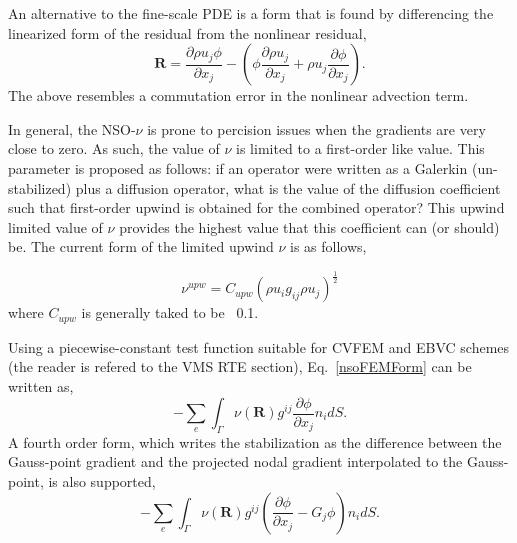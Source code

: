 An alternative to the fine-scale PDE is a form that is found by differencing the linearized
form of the residual from the nonlinear residual,
\begin{equation}
 \mathbf{R} = \frac{\partial \rho u_j \phi }{\partial x_j} - (\phi \frac{\partial \rho u_j }{\partial x_j} + \rho u_j \frac{\partial \phi}{\partial x_j}).
 \label{nsoResidualAlt}
\end{equation}
The above resembles a commutation error in the nonlinear advection term.

In general, the NSO-$\nu$ is prone to percision issues when the gradients are very close to 
zero. As such, the value of $\nu$ is limited to a first-order like value. This parameter is 
proposed as follows: if an operator were written as a Galerkin (un-stabilized) plus a diffusion 
operator, what is the value of the diffusion coefficient such that first-order upwind is obtained 
for the combined operator? This upwind limited value of $\nu$ provides the highest value that 
this coefficient can (or should) be. The current form of the limited upwind $\nu$ is as follows,

\begin{equation}
  \nu^{upw} = C_{upw}(\rho u_i g_{ij} \rho u_j )^{\frac{1}{2}}
\label{nsoFVForm}
\end{equation}
where $C_{upw}$ is generally taked to be ~0.1.

Using a piecewise-constant test function suitable for CVFEM and EBVC schemes (the reader is refered to 
the VMS RTE section), Eq.~\ref{nsoFEMForm} can be written as,
\begin{equation}
  -\sum_e \int_\Gamma \nu(\mathbf{R}) g^{ij} \frac{\partial \phi} {\partial x_j} n_i dS.
\label{nsoFVForm}
\end{equation}
%
A fourth order form, which writes the stabilization as the difference between the Gauss-point gradient 
and the projected nodal gradient interpolated to the Gauss-point, is also supported,
\begin{equation}
  -\sum_e \int_\Gamma \nu(\mathbf{R}) g^{ij} (\frac{\partial \phi} {\partial x_j} - G_j \phi ) n_i dS.
\label{nsoFVForm4th}
\end{equation}

